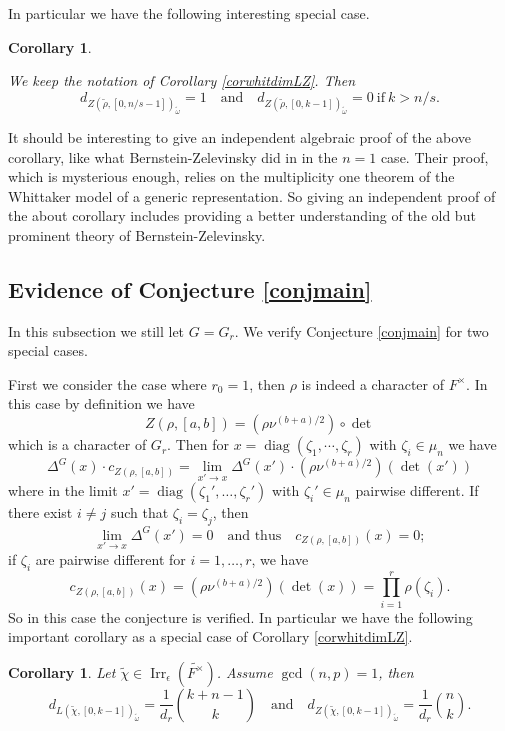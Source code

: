 \documentclass{amsart}
\numberwithin{equation}{section}
\newtheorem{corollary}[theorem]{\bf{Corollary}}
\newcommand{\mrdet}{\operatorname{det}}
\newcommand{\mrdiag}{\operatorname{diag}}
\newcommand{\mrgcd}{\operatorname{gcd}}
\newcommand{\mrirr}{\operatorname{Irr}}
\newcommand{\wt}[1]{\widetilde{#1}}
\begin{document}
		In particular we have the following interesting special case.
		
		\begin{corollary}\label{corwhitdimZlarge}
			
			We keep the notation of Corollary \ref{corwhitdimLZ}. Then $$d_{Z(\wt{\rho},[0,n/s-1])_{\wt{\omega}}}=1\quad \text{and}\quad d_{Z(\wt{\rho},[0,k-1])_{\wt{\omega}}}=0\ \text{if}\ k>n/s.$$
			
		\end{corollary}
		
		It should be interesting to give an independent algebraic proof of the above corollary, like what Bernstein-Zelevinsky did in \cite{bernstein1977induced, zelevinsky1980induced} in the $n=1$ case. Their proof, which is mysterious enough, relies on the multiplicity one theorem of the Whittaker model of a generic representation. So giving an independent proof of the about corollary includes providing a better understanding of the old but prominent theory of Bernstein-Zelevinsky.
		
		\subsection{Evidence of Conjecture \ref{conjmain}}\label{subsectioneviconj}
		
		In this subsection we still let $G=G_{r}$. We verify Conjecture \ref{conjmain} for  two special cases.
		
		First we consider the case where $r_{0}=1$, then $\rho$ is indeed a character of $F^{\times}$. In this case by definition we have $$Z(\rho,[a,b])=(\rho\nu^{(b+a)/2})\circ\mrdet$$
		which is a character of $G_{r}$. Then for $x=\mrdiag(\zeta_{1},\cdots,\zeta_{r})$ with $\zeta_{i}\in\mu_{n}$ we have
		$$\Delta^{G}(x)\cdot c_{Z(\rho,[a,b])}=\lim_{x'\rightarrow x}\Delta^{G}(x')\cdot(\rho\nu^{(b+a)/2})(\mrdet(x'))$$
		where in the limit $x'=\mrdiag(\zeta_{1}',\dots,\zeta_{r}')$ with $\zeta_{i}'\in\mu_{n}$ pairwise different. If there exist $i\neq j$ such that $\zeta_{i}=\zeta_{j}$, then $$\lim_{x'\rightarrow x}\Delta^{G}(x')=0\quad\text{and thus}\quad c_{Z(\rho,[a,b])}(x)=0;$$ 
		if $\zeta_{i}$ are pairwise different for $i=1,\dots,r$, we have $$c_{Z(\rho,[a,b])}(x)=(\rho\nu^{(b+a)/2})(\mrdet(x))=\prod_{i=1}^{r}\rho(\zeta_{i}).$$ So in this case the conjecture is verified. In particular we have the following important corollary as a special case of Corollary \ref{corwhitdimLZ}.
		
		\begin{corollary}
			
			Let $\wt{\chi}\in\mrirr_{\epsilon}(\wt{F^{\times}})$. Assume $\mrgcd(n,p)=1$, then
			$$d_{L(\wt{\chi},[0,k-1])_{\wt{\omega}}}=\frac{1}{d_{r}}\binom{k+n-1}{k}\quad\text{and}\quad d_{Z(\wt{\chi},[0,k-1])_{\wt{\omega}}}=\frac{1}{d_{r}}\binom{n}{k}.$$
			
		\end{corollary}
		
\end{document}
